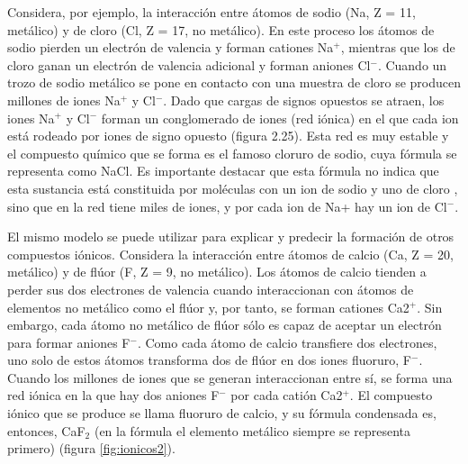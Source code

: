 \documentclass[11pt]{book}
\begin{document}
Considera, por ejemplo, la interacción entre átomos de sodio (Na, Z = 11, metálico) y de cloro
(Cl, Z = 17, no metálico). En este proceso los átomos de sodio pierden un electrón de valencia
y forman cationes Na$^+$, mientras que los de cloro ganan un electrón de valencia adicional y forman
aniones Cl$^-$. Cuando un trozo de sodio metálico se pone en contacto con una muestra de cloro se
producen millones de iones Na$^+$ y Cl$^-$. Dado que cargas de signos opuestos se atraen, los iones
Na$^+$ y Cl$^-$ forman un conglomerado de iones (red iónica) en el que cada ion está rodeado por iones de signo opuesto (figura 2.25). Esta red es muy estable y el compuesto químico que se forma es el famoso cloruro de sodio, cuya fórmula se representa como NaCl. Es importante destacar que esta fórmula no indica que esta sustancia está constituida por moléculas con un ion de sodio y uno de cloro , sino que en la red tiene miles de iones, y por cada ion de Na+ hay un ion de Cl$^-$.

El mismo modelo se puede utilizar para explicar y predecir la formación de otros compuestos iónicos.
Considera la interacción entre átomos de calcio (Ca, Z = 20, metálico) y de flúor (F, Z = 9, no
metálico). Los átomos de calcio tienden a perder sus dos electrones de valencia cuando interaccionan
con átomos de elementos no metálico como el flúor y, por tanto, se forman cationes Ca2$^+$.
Sin embargo, cada átomo no metálico de flúor sólo es capaz de aceptar un electrón para formar
aniones F$^-$. Como cada átomo de calcio transfiere dos electrones, uno solo de estos átomos
transforma dos de flúor en dos iones fluoruro, F$^-$. Cuando los millones de iones que se generan
interaccionan entre sí, se forma una red iónica en la que hay dos aniones F$^-$ por cada
catión Ca2$^+$. El compuesto iónico que se produce se llama fluoruro de calcio, y su fórmula
condensada es, entonces, CaF$_2$ (en la fórmula el elemento metálico siempre se representa primero)
(figura \ref{fig:ionicos2}).\\
\end{document}
